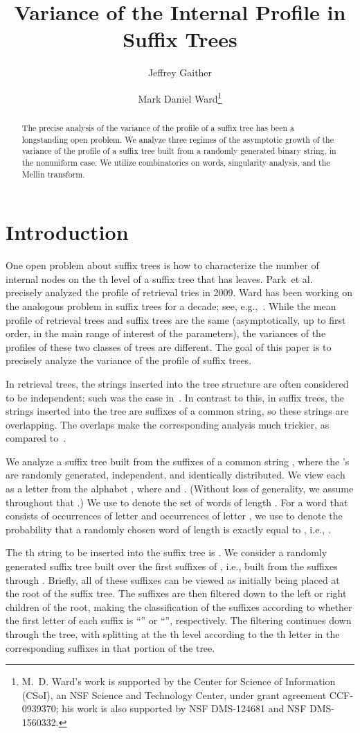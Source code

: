 \documentclass[proceedings]{aofa}
\author[J. Gaither and M.~D. Ward]{Jeffrey Gaither\addressmark{1}\and
  Mark Daniel Ward\addressmark{2}\thanks{M.~D. Ward's work is
    supported by the Center for Science of Information (CSoI), an NSF
    Science and Technology Center, under grant agreement CCF-0939370;
    his work is also supported by NSF DMS-124681 and NSF DMS-1560332.}}
\title{Variance of the Internal Profile in Suffix Trees}
\begin{document}
\maketitle
\begin{abstract}
The precise analysis of the variance of the profile of a suffix tree
has been a longstanding open problem.
We analyze three regimes of 
the asymptotic growth of the variance of the profile of a
suffix tree built from a randomly generated binary string,
in the nonuniform case.  We utilize
combinatorics on words, singularity analysis, and the Mellin transform.
\end{abstract}

\section{Introduction}

One open problem about suffix trees is how to characterize the number
of internal nodes on the th level of a suffix tree that has  leaves.
Park~et al.~\cite{Park:2009} precisely analyzed the profile of
retrieval tries in 2009.  
Ward has been working on the analogous problem in suffix trees for a
decade; see, e.g.,~\cite{NicodemeWard:2011,Ward:2007}.
While the mean profile of retrieval trees and suffix trees are 
the same (asymptotically, up to first order, in the main range of
interest of the parameters), the variances of the profiles of these
two classes of trees are different.  The goal of this paper is to
precisely analyze the variance of the profile of suffix trees.

In retrieval trees, the strings inserted
into the tree structure are often considered to be independent;
such was the case in~\cite{Park:2009}.  In contrast to this, in
suffix trees, the strings inserted into the tree are suffixes of a
common string, so these strings are overlapping.  The overlaps
make the corresponding analysis much trickier, as compared to~\cite{Park:2009}.

We analyze a suffix tree built from the suffixes of a common string
, where the 's are randomly
generated, independent, and identically distributed.  We view each
 as a letter from the alphabet , where  and .  (Without loss of generality, we
assume throughout that .)  
We use  to denote the set of words of length .
For a word  that consists of  occurrences of letter
 and  occurrences of letter , we use  to denote the
probability that a randomly chosen word of length  is exactly
equal to , i.e., .

The th string to be inserted into the suffix tree is
.  We consider a randomly
generated suffix tree
 built over the first  suffixes of , i.e.,
built from the suffixes  through .
Briefly, all  of these suffixes can be viewed as initially being
placed at the root of the suffix tree.  The  suffixes are then
filtered down to the left or right children of the root, making the
classification of the suffixes according to whether the first letter
of each suffix is ``'' or ``'', respectively.  The filtering
continues down through the tree, with splitting at the th level
according to the th letter in the corresponding suffixes in that
portion of the tree.
\end{document}
